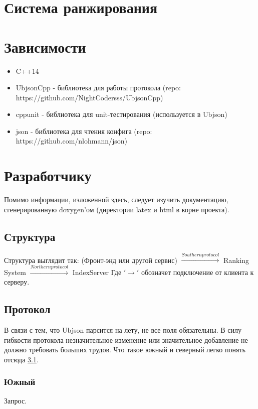 \documentclass[12pt,a4paper]{article}
\begin{document}
\section{Система ранжирования}



\section{Зависимости}

\begin{itemize}
    \item C++14
    \item UbjsonCpp  - библиотека для работы протокола (repo: https://github.com/NightCodersss/UbjsonCpp)
    \item cppunit - библиотека для unit-тестирования (используется в Ubjson)
	\item json - библиотека для чтения конфига (repo: https://github.com/nlohmann/json)
\end{itemize}

\section{Разработчику}
Помимо информации, изложенной здесь, следует изучить документацию, сгенерированную doxygen'ом (директории latex и html в корне проекта).

\subsection{Структура}
\label{subsec:generalStructure}
Структура выглядит так:
(Фронт-энд или другой сервис) $\xrightarrow{Southern protocol}$ Ranking System $\xrightarrow{Northern protocol}$ IndexServer
Где $'\rightarrow'$ обозначет подключение от клиента к серверу.

\subsection{Протокол}
В связи с тем, что Ubjson парсится на лету, не все поля обязательны. 
В силу гибкости протокола незначительное изменение или значительное добавление не должно требовать больших трудов.
Что такое южный и северный легко понять отсюда \ref{subsec:generalStructure}.

\subsubsection{Южный}
Запрос.
\end{document}
